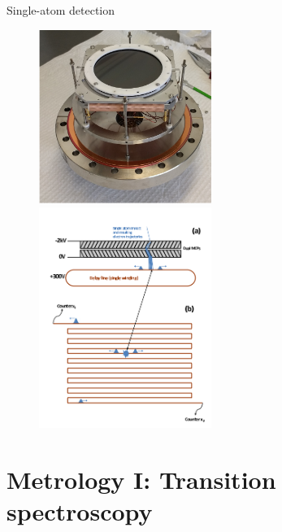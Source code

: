 \documentclass{beamer}
\begin{document}
\begin{frame}{Single-atom detection}
\begin{figure}
    \centering
    \includegraphics[width=0.5\textwidth]{figures/Intro/detector.png}
    \includegraphics[width=0.5\textwidth]{figures/Intro/dld_schematic.png}
    \label{fig:my_label}
\end{figure}    
\end{frame}

\section{Metrology I: Transition spectroscopy}


\end{document}
